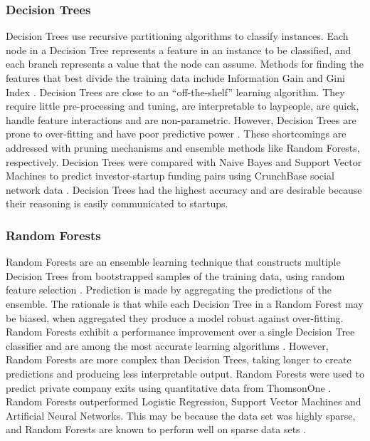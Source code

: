 \documentclass[../thesis/thesis.tex]{subfiles}
\begin{document}
\subsubsection{Decision Trees}

Decision Trees use recursive partitioning algorithms to classify instances. Each node in a Decision Tree represents a feature in an instance to be classified, and each branch represents a value that the node can assume. Methods for finding the features that best divide the training data include Information Gain and Gini Index \cite{kotsiantis2007}. Decision Trees are close to an ``off-the-shelf'' learning algorithm. They require little pre-processing and tuning, are interpretable to laypeople, are quick, handle feature interactions and are non-parametric. However, Decision Trees are prone to over-fitting and have poor predictive power \cite{caruana2006}. These shortcomings are addressed with pruning mechanisms and ensemble methods like Random Forests, respectively. Decision Trees were compared with Naive Bayes and Support Vector Machines to predict investor-startup funding pairs using CrunchBase social network data \cite{liang2016}. Decision Trees had the highest accuracy and are desirable because their reasoning is easily communicated to startups.

\subsubsection{Random Forests}

Random Forests are an ensemble learning technique that constructs multiple Decision Trees from bootstrapped samples of the training data, using random feature selection \cite{breiman2001}. Prediction is made by aggregating the predictions of the ensemble. The rationale is that while each Decision Tree in a Random Forest may be biased, when aggregated they produce a model robust against over-fitting.  Random Forests exhibit a performance improvement over a single Decision Tree classifier and are among the most accurate learning algorithms \cite{caruana2006}.  However, Random Forests are more complex than Decision Trees, taking longer to create predictions and producing less interpretable output. Random Forests were used to predict private company exits using quantitative data from ThomsonOne \cite{bhat2011}. Random Forests outperformed Logistic Regression, Support Vector Machines and Artificial Neural Networks. This may be because the data set was highly sparse, and Random Forests are known to perform well on sparse data sets \cite{breiman2001}.
\end{document}
